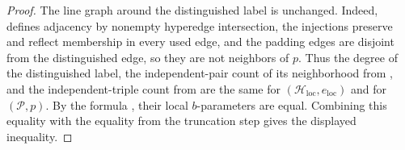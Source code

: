 \begin{proof}
The line graph around the distinguished label is unchanged.  Indeed,
 defines adjacency by nonempty hyperedge
intersection, the injections preserve and reflect membership in every used
edge, and the padding edges are disjoint from the distinguished edge, so
they are not neighbors of $p$.  Thus the degree of the distinguished label,
the independent-pair count of its neighborhood from
, and the independent-triple count from
 are the same for
$(\mathcal H_{\mathrm{loc}},e_{\mathrm{loc}})$ and for
$(\mathcal P,p)$.  By the formula , their local
$b$-parameters are equal.  Combining this equality with the equality from
the truncation step gives the displayed inequality.
\end{proof}
